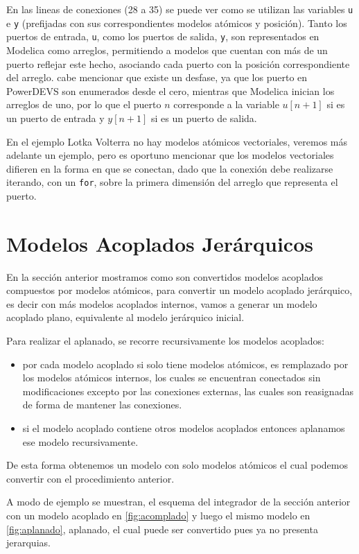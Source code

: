 	En las lineas de conexiones (28 a 35) se puede ver como se utilizan las variables \texttt{u} e \texttt{y} (prefijadas con sus correspondientes modelos
	atómicos y posición). Tanto los puertos de entrada, \texttt{u}, como los puertos de salida, \texttt{y}, son representados en Modelica como arreglos,
	permitiendo a modelos que cuentan con más de un puerto reflejar este hecho, asociando cada puerto con la posición correspondiente del arreglo. 
	cabe mencionar que existe un desfase, ya que los puerto en PowerDEVS son enumerados desde el cero, mientras que Modelica inician los arreglos de uno, por lo
	que el puerto $n$ corresponde a la variable $u[n+1]$ si es un puerto de entrada y $y[n+1]$ si es un puerto de salida.

	En el ejemplo Lotka Volterra no hay modelos atómicos vectoriales, veremos más adelante un ejemplo, pero es oportuno mencionar que los modelos
	vectoriales difieren en la forma en que se conectan, dado que la conexión debe realizarse iterando, con un \texttt{for}, sobre la primera dimensión del 
	arreglo que representa el puerto. 


\section{Modelos Acoplados Jerárquicos}
En la sección anterior mostramos como son convertidos modelos acoplados compuestos por modelos atómicos, para convertir un modelo acoplado jerárquico, es decir con más modelos acoplados internos, vamos a generar un modelo acoplado plano, equivalente al modelo jerárquico inicial.

Para realizar el aplanado, se recorre recursivamente los modelos acoplados:

\begin{itemize}
\item por cada modelo acoplado si solo tiene modelos atómicos, es remplazado por los modelos atómicos internos, los cuales se encuentran conectados sin modificaciones excepto por las conexiones externas, las cuales son reasignadas de forma de mantener las conexiones.
\item si el modelo acoplado contiene otros modelos acoplados entonces aplanamos ese modelo recursivamente.
\end{itemize} 

De esta forma obtenemos un modelo con solo modelos atómicos el cual podemos convertir con el procedimiento anterior.

A modo de ejemplo se muestran, el esquema del integrador de la sección anterior con un modelo acoplado en \ref{fig:acomplado} y luego el mismo modelo en \ref{fig:aplanado}, aplanado, el cual puede ser convertido pues ya no presenta jerarquias.

